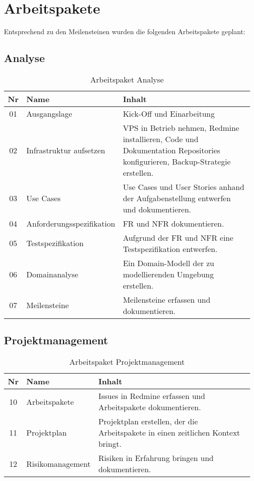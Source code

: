 \section{Arbeitspakete}
\label{sec:Arbeitspakete}

Entsprechend zu den Meilensteinen wurden die folgenden Arbeitspakete geplant:

\subsection{Analyse}
\begin{table}[H]
\begin{tabularx}{\textwidth}{ c | l | X }
\textbf{Nr} & \textbf{Name} & \textbf{Inhalt} \\ \hline
01 & Ausgangslage & Kick-Off und Einarbeitung \\ \hline
02 & Infrastruktur aufsetzen & \acs{VPS} in Betrieb nehmen, Redmine installieren, Code und Dokumentation Repositories konfigurieren, Backup-Strategie erstellen. \\ \hline
03 & Use Cases & Use Cases und User Stories anhand der Aufgabenstellung entwerfen und dokumentieren.\\ \hline
04 & Anforderungsspezifikation & \ac{FR} und \ac{NFR} dokumentieren.\\ \hline
05 & Testspezifikation & Aufgrund der \ac{FR} und \ac{NFR} eine Testspezifikation entwerfen.\\ \hline
06 & Domainanalyse & Ein Domain-Modell der zu modellierenden Umgebung erstellen.\\ \hline
07 & Meilensteine & Meilensteine erfassen und dokumentieren.\\
\end{tabularx}
\caption{Arbeitspaket Analyse}
\end{table}

\subsection{Projektmanagement}
\begin{table}[H]
\begin{tabularx}{\textwidth}{ c | l | X }
\textbf{Nr} & \textbf{Name} & \textbf{Inhalt} \\ \hline
10 & Arbeitspakete & Issues in Redmine erfassen und Arbeitspakete dokumentieren. \\ \hline
11 & Projektplan & Projektplan erstellen, der die Arbeitspakete in einen zeitlichen Kontext bringt.\\ \hline
12 & Risikomanagement & Risiken in Erfahrung bringen und dokumentieren.\\
\end{tabularx}
\caption{Arbeitspaket Projektmanagement}
\end{table}

